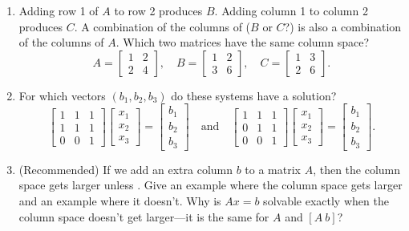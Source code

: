 \documentclass[14pt, a4paper]{article}
\begin{document}
\begin{enumerate}
    \item Adding row 1 of $A$ to row 2 produces $B$. Adding column 1 to column 2 produces $C$. A combination of the columns of ($B$ or $C$?) is also a combination of the columns of $A$. Which two matrices have the same column space?
          \[
              A = \begin{bmatrix}1&2\\2&4\end{bmatrix},\quad
              B = \begin{bmatrix}1&2\\3&6\end{bmatrix},\quad
              C = \begin{bmatrix}1&3\\2&6\end{bmatrix}.
          \]

    \item For which vectors $(b_1,b_2,b_3)$ do these systems have a solution?
          \[
              \begin{bmatrix}1&1&1\\1&1&1\\0&0&1\end{bmatrix}
              \begin{bmatrix}x_1\\x_2\\x_3\end{bmatrix}
              =
              \begin{bmatrix}b_1\\b_2\\b_3\end{bmatrix}
              \quad\text{and}\quad
              \begin{bmatrix}1&1&1\\0&1&1\\0&0&1\end{bmatrix}
              \begin{bmatrix}x_1\\x_2\\x_3\end{bmatrix}
              =
              \begin{bmatrix}b_1\\b_2\\b_3\end{bmatrix}.
          \]

    \item (Recommended) If we add an extra column $b$ to a matrix $A$, then the column space gets larger unless \underline{\hspace{4cm}}. Give an example where the column space gets larger and an example where it doesn't. Why is $Ax = b$ solvable exactly when the column space doesn't get larger---it is the same for $A$ and $[A\ b]$?


\end{enumerate}
\end{document}
